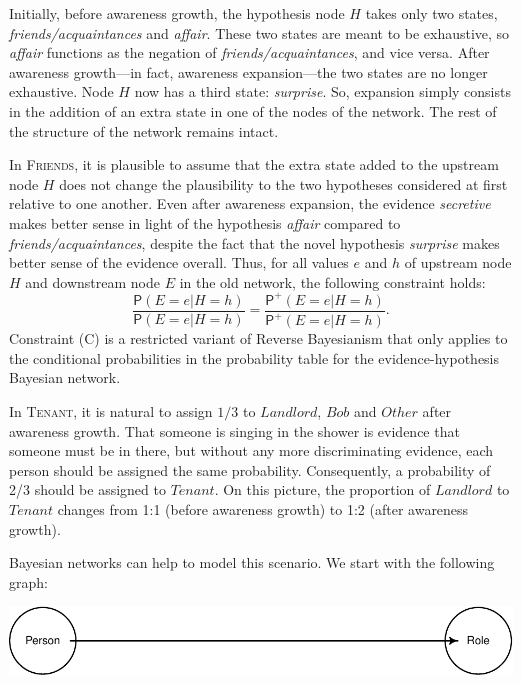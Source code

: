 \documentclass[
  11pt,
  dvipsnames,enabledeprecatedfontcommands]{scrartcl}
\newcommand{\pr}[1]{\ensuremath{\mathsf{P}(#1)}}
\newcommand{\ppr}[2]{\ensuremath{\mathsf{P}^{#1}(#2)}}
\begin{document}
Initially, before awareness growth, the hypothesis node \(H\) takes only
two states, \textit{friends/acquaintances} and \textit{affair}. These
two states are meant to be exhaustive, so \textit{affair} functions as
the negation of \textit{friends/acquaintances}, and vice versa. After
awareness growth---in fact, awareness expansion---the two states are no
longer exhaustive. Node \(H\) now has a third state: \textit{surprise}.
So, expansion simply consists in the addition of an extra state in one
of the nodes of the network. The rest of the structure of the network
remains intact.

In \textsc{Friends}, it is plausible to assume that the extra state
added to the upstream node \(H\) does not change the plausibility to the
two hypotheses considered at first relative to one another. Even after
awareness expansion, the evidence \textit{secretive} makes better sense
in light of the hypothesis \textit{affair} compared to
\textit{friends/acquaintances}, despite the fact that the novel
hypothesis \textit{surprise} makes better sense of the evidence overall.
Thus, for all values \(e\) and \(h\) of upstream node \(H\) and
downstream node \(E\) in the old network, the following constraint
holds:
\[\frac{\pr{E=e \vert H=h}}{\pr{E=e \vert H=h}} = \frac{\ppr{+}{E=e \vert H=h}}{\ppr{+}{E=e \vert H=h}}. \tag{C}\]
Constraint (C) is a restricted variant of Reverse Bayesianism that only
applies to the conditional probabilities in the probability table for
the evidence-hypothesis Bayesian network.

In \textsc{Tenant}, it is natural to assign \(1/3\) to \(Landlord\),
\(Bob\) and \(Other\) after awareness growth. That someone is singing in
the shower is evidence that someone must be in there, but without any
more discriminating evidence, each person should be assigned the same
probability. Consequently, a probability of 2/3 should be assigned to
\(Tenant\). On this picture, the proportion of \(Landlord\) to
\(Tenant\) changes from 1:1 (before awareness growth) to 1:2 (after
awareness growth).

Bayesian networks can help to model this scenario. We start with the
following graph:

\begin{center}\includegraphics[width=0.5\linewidth,height=0.3\textheight]{ReplyToSteeleStefansson5_files/figure-latex/tenantsDAG-new-1} \end{center}
\end{document}
